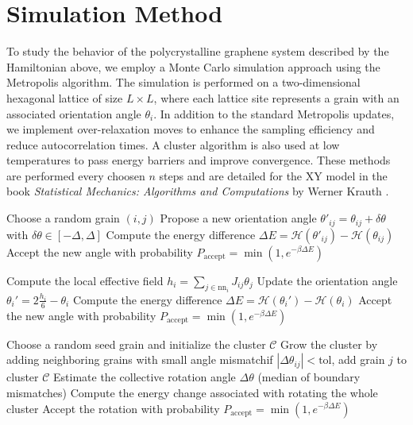 \section{Simulation Method}

To study the behavior of the polycrystalline graphene system described by the Hamiltonian above, we employ a Monte Carlo simulation approach using the Metropolis algorithm. The simulation is performed on a two-dimensional hexagonal lattice of size $L \times L$, where each lattice site represents a grain with an associated orientation angle $\theta_i$. In addition to the standard Metropolis updates, we implement over-relaxation moves to enhance the sampling efficiency and reduce autocorrelation times. A cluster algorithm is also used at low temperatures to pass energy barriers and improve convergence. These methods are performed every choosen $n$ steps and are detailed for the XY model in the book \textit{Statistical Mechanics: Algorithms and Computations} by Werner Krauth \cite{Krauth2006}.

\begin{algorithm}[H]
\caption{Standard Monte Carlo Step}
\begin{algorithmic}[1]
\STATE Choose a random grain $(i,j)$
\STATE Propose a new orientation angle $\theta'_{ij} = \theta_{ij} + \delta \theta$ with $\delta \theta \in [-\Delta, \Delta]$
\STATE Compute the energy difference $\Delta E = \mathcal{H}(\theta'_{ij}) - \mathcal{H}(\theta_{ij})$
\STATE Accept the new angle with probability $P_{\text{accept}} = \min(1, e^{-\beta \Delta E})$
\end{algorithmic}
\end{algorithm}

\begin{algorithm}[H]
\caption{Over-Relaxation Step}
\begin{algorithmic}[1]
    \STATE Compute the local effective field $h_i = \sum_{j \in \text{nn}_i} J_{ij} \theta_j$
    \STATE Update the orientation angle $\theta_i' = 2 \frac{h_i}{6} - \theta_i$
    \STATE Compute the energy difference $\Delta E = \mathcal{H}(\theta_i') - \mathcal{H}(\theta_i)$
    \STATE Accept the new angle with probability $P_{\text{accept}} = \min(1, e^{-\beta \Delta E})$
\ENDFOR
\end{algorithmic}
\end{algorithm}

\begin{algorithm}[H]
\caption{Cluster Update Step}
\begin{algorithmic}[1]
\STATE Choose a random seed grain and initialize the cluster $\mathcal{C}$
\STATE Grow the cluster by adding neighboring grains with small angle mismatchif $|\Delta \theta_{ij}| < \text{tol}$, add grain $j$ to cluster $\mathcal{C}$
\STATE Estimate the collective rotation angle $\Delta\theta$ (median of boundary mismatches)
\STATE Compute the energy change associated with rotating the whole cluster 
\STATE Accept the rotation with probability $P_{\text{accept}} = \min(1, e^{-\beta \Delta E})$
\end{algorithmic}
\end{algorithm}

